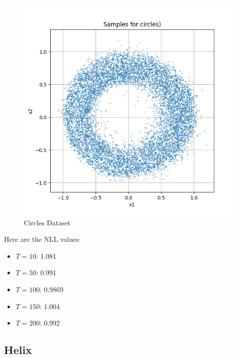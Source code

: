 \documentclass[a4paper,12pt]{article}
\begin{document}
\begin{figure}[H]
\begin{minipage}{0.3\textwidth}
  \end{minipage}
  \begin{minipage}{0.3\textwidth}
      \centering
      \includegraphics[width=\linewidth]{"images/Samples for ddpm_2_200_0.0001_0.02_circles.png"}
  \end{minipage}

  \caption{Circles Dataset}
\end{figure}


Here are the NLL values:
\begin{itemize}
  \item $T = 10$: 1.081
  \item $T = 50$: 0.991
  \item $T = 100$: 0.9869
  \item $T = 150$: 1.004
  \item $T = 200$: 0.992
\end{itemize}


\clearpage

\subsection*{Helix}
\end{document}

